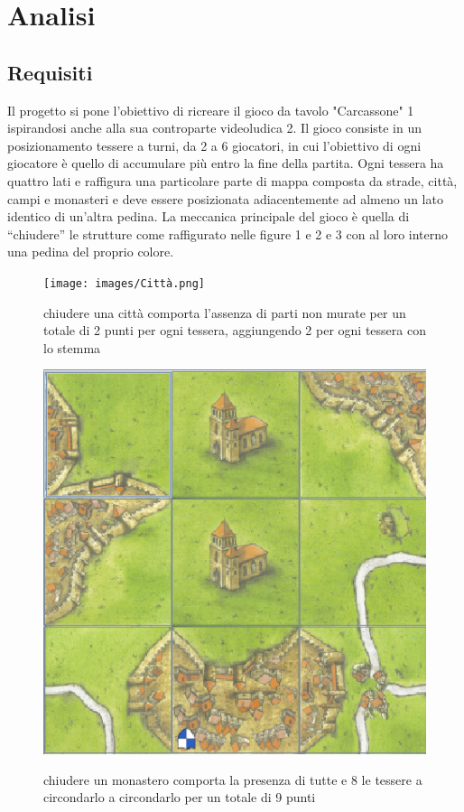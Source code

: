 \section{Analisi}
\subsection{Requisiti}

Il progetto si pone l'obiettivo di ricreare il gioco da tavolo "Carcassone" 1 ispirandosi anche alla sua controparte videoludica 2. Il gioco consiste in un posizionamento tessere a turni, da 2 a 6 giocatori, in cui l’obiettivo di ogni giocatore è quello di accumulare più entro la fine della partita. Ogni tessera ha quattro lati e raffigura una particolare parte di mappa composta da strade, città, campi e monasteri e deve essere posizionata adiacentemente ad almeno un lato identico di un'altra pedina. La meccanica principale del gioco è quella di “chiudere” le strutture come raffigurato nelle figure 1 e 2 e 3 con al loro interno una pedina del proprio colore.

\begin{figure}[]
    {\texttt{[image: images/Città.png]}}

    \caption{chiudere una città comporta l’assenza di parti non murate per un totale di 2 punti per ogni tessera, aggiungendo 2 per ogni tessera con lo stemma}
\end{figure}

\begin{figure}[]
    {\includegraphics[]{images/Monastero.png}}

    \caption{chiudere un monastero comporta la presenza di tutte e 8 le tessere a circondarlo a circondarlo per un totale di 9 punti}
\end{figure}

